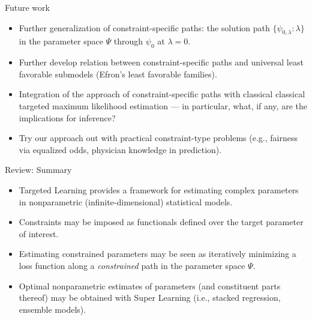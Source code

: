 \documentclass[12pt,t,handout]{beamer}
\begin{document}
\begin{frame}[c]{Future work}

\begin{center}
\begin{itemize}
  \itemsep12pt
  \item Further generalization of constraint-specific paths: the solution path
    $\{\psi_{0, \lambda}: \lambda\}$ in the parameter space $\Psi$ through
    $\psi_0$ at $\lambda = 0$.
  \item Further develop relation between constraint-specific paths and universal
    least favorable submodels (Efron's least favorable families).
  \item Integration of the approach of constraint-specific paths with classical
    classical targeted maximum likelihood estimation --- in particular, what, if
    any, are the implications for inference?
  \item Try our approach out with practical constraint-type problems (e.g.,
    fairness via equalized odds, physician knowledge in prediction).
\end{itemize}
\end{center}

\note{
}

\end{frame}


\begin{frame}[c]{Review: Summary}

\begin{center}
\begin{itemize}
  \itemsep12pt
  \item Targeted Learning provides a framework for estimating complex parameters
    in nonparametric (infinite-dimensional) statistical models.
  \item Constraints may be imposed as functionals defined over the target
    parameter of interest.
  \item Estimating constrained parameters may be seen as iteratively minimizing
    a loss function along a \textit{constrained} path in the parameter space
    $\Psi$.
  \item Optimal nonparametric estimates of parameters (and constituent parts
    thereof) may be obtained with Super Learning (i.e., stacked regression,
    ensemble models).
\end{itemize}
\end{center}


\end{frame}
\end{document}
